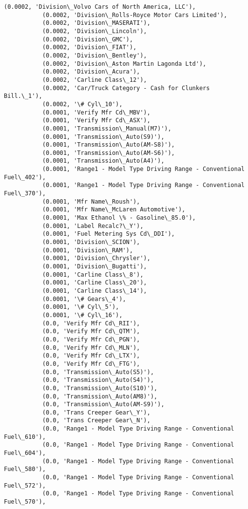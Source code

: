\documentclass[11pt]{article}
\begin{document}
\begin{Verbatim}[commandchars=\\\{\}]
           (0.0002, 'Division\_Volvo Cars of North America, LLC'),
           (0.0002, 'Division\_Rolls-Royce Motor Cars Limited'),
           (0.0002, 'Division\_MASERATI'),
           (0.0002, 'Division\_Lincoln'),
           (0.0002, 'Division\_GMC'),
           (0.0002, 'Division\_FIAT'),
           (0.0002, 'Division\_Bentley'),
           (0.0002, 'Division\_Aston Martin Lagonda Ltd'),
           (0.0002, 'Division\_Acura'),
           (0.0002, 'Carline Class\_12'),
           (0.0002, 'Car/Truck Category - Cash for Clunkers Bill.\_1'),
           (0.0002, '\# Cyl\_10'),
           (0.0001, 'Verify Mfr Cd\_MBV'),
           (0.0001, 'Verify Mfr Cd\_ASX'),
           (0.0001, 'Transmission\_Manual(M7)'),
           (0.0001, 'Transmission\_Auto(S9)'),
           (0.0001, 'Transmission\_Auto(AM-S8)'),
           (0.0001, 'Transmission\_Auto(AM-S6)'),
           (0.0001, 'Transmission\_Auto(A4)'),
           (0.0001, 'Range1 - Model Type Driving Range - Conventional Fuel\_402'),
           (0.0001, 'Range1 - Model Type Driving Range - Conventional Fuel\_370'),
           (0.0001, 'Mfr Name\_Roush'),
           (0.0001, 'Mfr Name\_McLaren Automotive'),
           (0.0001, 'Max Ethanol \% - Gasoline\_85.0'),
           (0.0001, 'Label Recalc?\_Y'),
           (0.0001, 'Fuel Metering Sys Cd\_DDI'),
           (0.0001, 'Division\_SCION'),
           (0.0001, 'Division\_RAM'),
           (0.0001, 'Division\_Chrysler'),
           (0.0001, 'Division\_Bugatti'),
           (0.0001, 'Carline Class\_8'),
           (0.0001, 'Carline Class\_20'),
           (0.0001, 'Carline Class\_14'),
           (0.0001, '\# Gears\_4'),
           (0.0001, '\# Cyl\_5'),
           (0.0001, '\# Cyl\_16'),
           (0.0, 'Verify Mfr Cd\_RII'),
           (0.0, 'Verify Mfr Cd\_QTM'),
           (0.0, 'Verify Mfr Cd\_PGN'),
           (0.0, 'Verify Mfr Cd\_MLN'),
           (0.0, 'Verify Mfr Cd\_LTX'),
           (0.0, 'Verify Mfr Cd\_FTG'),
           (0.0, 'Transmission\_Auto(S5)'),
           (0.0, 'Transmission\_Auto(S4)'),
           (0.0, 'Transmission\_Auto(S10)'),
           (0.0, 'Transmission\_Auto(AM8)'),
           (0.0, 'Transmission\_Auto(AM-S9)'),
           (0.0, 'Trans Creeper Gear\_Y'),
           (0.0, 'Trans Creeper Gear\_N'),
           (0.0, 'Range1 - Model Type Driving Range - Conventional Fuel\_610'),
           (0.0, 'Range1 - Model Type Driving Range - Conventional Fuel\_604'),
           (0.0, 'Range1 - Model Type Driving Range - Conventional Fuel\_580'),
           (0.0, 'Range1 - Model Type Driving Range - Conventional Fuel\_572'),
           (0.0, 'Range1 - Model Type Driving Range - Conventional Fuel\_570'),

\end{Verbatim}
\end{document}
